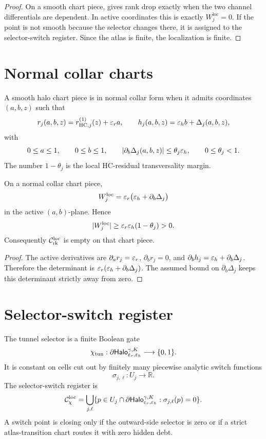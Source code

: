 \begin{proof}
On a smooth chart piece, gives rank drop exactly when the two channel differentials are dependent. In active coordinates this is exactly \(W_j^{\mathrm{loc}}=0\). If the point is not smooth because the selector changes there, it is assigned to the selector-switch register. Since the atlas is finite, the localization is finite.
\end{proof}

\section{Normal collar charts}

\begin{definition}
A smooth halo chart piece is in normal collar form when it admits coordinates \((a,b,z)\) such that
\[
r_j(a,b,z)=r_{\mathrm{HC},j}^{(1)}(z)+\varepsilon_r a,
\qquad
h_j(a,b,z)=\varepsilon_h b+\Delta_j(a,b,z),
\]
with
\[
0\le a\le1,
\qquad
0\le b\le1,
\qquad
|\partial_b\Delta_j(a,b,z)|\le \theta_j\varepsilon_h,
\qquad
0\le\theta_j<1.
\]
The number \(1-\theta_j\) is the local HC-residual transversality margin.
\end{definition}

\begin{proposition}
On a normal collar chart piece,
\[
W_j^{\mathrm{loc}}=\varepsilon_r\bigl(\varepsilon_h+\partial_b\Delta_j\bigr)
\]
in the active \((a,b)\)-plane. Hence
\[
|W_j^{\mathrm{loc}}|\ge \varepsilon_r\varepsilon_h(1-\theta_j)>0.
\]
Consequently \(\mathcal C_{\mathrm{rk}}^{\mathrm{loc}}\) is empty on that chart piece.
\end{proposition}

\begin{proof}
The active derivatives are \(\partial_a r_j=\varepsilon_r\), \(\partial_b r_j=0\), and \(\partial_b h_j=\varepsilon_h+\partial_b\Delta_j\). Therefore the determinant is \(\varepsilon_r(\varepsilon_h+\partial_b\Delta_j)\). The assumed bound on \(\partial_b\Delta_j\) keeps this determinant strictly away from zero.
\end{proof}

\section{Selector-switch register}

\begin{definition}
The tunnel selector is a finite Boolean gate
\[
\chi_{\mathrm{tun}}:\partial \mathsf{Halo}_{\varepsilon_r,\varepsilon_h}^{\gamma,K}\longrightarrow\{0,1\}.
\]
It is constant on cells cut out by finitely many piecewise analytic switch functions
\[
\sigma_{j,\ell}:U_j\longrightarrow\mathbb R.
\]
The selector-switch register is
\[
\mathcal C_{\chi}^{\mathrm{loc}}=
\bigcup_{j,\ell}
\{p\in U_j\cap\partial \mathsf{Halo}_{\varepsilon_r,\varepsilon_h}^{\gamma,K}:
\sigma_{j,\ell}(p)=0\}.
\]
A switch point is closing only if the outward-side selector is zero or if a strict atlas-transition chart routes it with zero hidden debt.
\end{definition}

